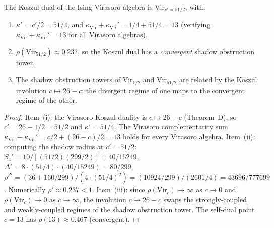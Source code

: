 \begin{proposition}%
\label{prop:ising-koszul-dual}
The Koszul dual of the Ising Virasoro algebra is
$\mathrm{Vir}_{c' = 51/2}$, with:
\begin{enumerate}[label=\textup{(\roman*)}]
\item $\kappa' = c'/2 = 51/4$, and
$\kappa_{\mathrm{Vir}} + \kappa_{\mathrm{Vir}}' = 1/4 + 51/4 = 13$ \textup{(}verifying
$\kappa_{\mathrm{Vir}}+\kappa_{\mathrm{Vir}}' = 13$ for all Virasoro algebras\textup{)}.
\item $\rho(\mathrm{Vir}_{51/2}) \approx 0.237$, so the Koszul dual
has a \emph{convergent} shadow obstruction tower.
\item The shadow obstruction towers of $\mathrm{Vir}_{1/2}$ and
$\mathrm{Vir}_{51/2}$ are related by the Koszul involution
$c \mapsto 26 - c$; the divergent regime of one maps to the
convergent regime of the other.
\end{enumerate}
\end{proposition}

\begin{proof}
Item~(i): the Virasoro Koszul duality is $c \mapsto 26 - c$
(Theorem~D), so $c' = 26 - 1/2 = 51/2$ and
$\kappa' = 51/4$. The Virasoro complementarity sum
$\kappa_{\mathrm{Vir}} + \kappa_{\mathrm{Vir}}' = c/2 + (26-c)/2 = 13$ holds for every
Virasoro algebra.
Item~(ii): computing the shadow radius at $c' = 51/2$:
$S_4' = 10/[(51/2)(299/2)] = 40/15249$,
$\Delta' = 8 \cdot (51/4) \cdot (40/15249) = 80/299$,
$\rho'^2 = (36 + 160/299)/(4 \cdot (51/4)^2)
= (10924/299)/(2601/4)
= 43696/777699$.
Numerically $\rho' \approx 0.237 < 1$.
Item~(iii): since $\rho(\mathrm{Vir}_c) \to \infty$ as $c \to 0$
and $\rho(\mathrm{Vir}_c) \to 0$ as $c \to \infty$, the involution
$c \mapsto 26 - c$ swaps the strongly-coupled and weakly-coupled
regimes of the shadow obstruction tower. The self-dual point $c = 13$
has $\rho(13) \approx 0.467$ (convergent).
\end{proof}

